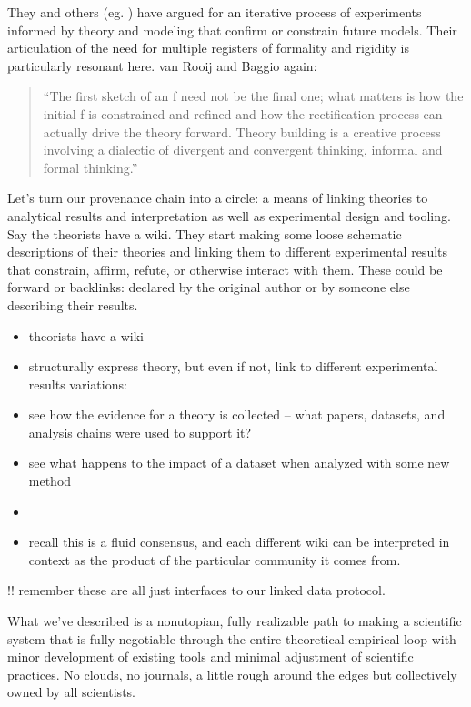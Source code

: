 \documentclass[notoc]{tufte-book}
\begin{document}
They and others (eg. \citep{guestHowComputationalModeling2021} )
have argued for an iterative process of experiments informed by theory
and modeling that confirm or constrain future models. Their articulation
of the need for multiple registers of formality and rigidity is
particularly resonant here. van Rooij and Baggio again:

\begin{quote}
``The first sketch of an f need not be the final one; what matters is
how the initial f is constrained and refined and how the rectification
process can actually drive the theory forward. Theory building is a
creative process involving a dialectic of divergent and convergent
thinking, informal and formal thinking.'' \citep{vanrooijTheoryTestHow2021} 
\end{quote}

Let's turn our provenance chain into a circle: a means of linking
theories to analytical results and interpretation as well as
experimental design and tooling. Say the theorists have a wiki. They
start making some loose schematic descriptions of their theories and
linking them to different experimental results that constrain, affirm,
refute, or otherwise interact with them. These could be forward or
backlinks: declared by the original author or by someone else describing
their results.


\begin{itemize}

\item
  theorists have a wiki
\item
  structurally express theory, but even if not, link to different
  experimental results variations:
\item
  see how the evidence for a theory is collected -- what papers,
  datasets, and analysis chains were used to support it?
\item
  see what happens to the impact of a dataset when analyzed with some
  new method
\item
\item
  recall this is a fluid consensus, and each different wiki can be
  interpreted in context as the product of the particular community it
  comes from.
\end{itemize}

!! remember these are all just interfaces to our linked data protocol.

What we've described is a nonutopian, fully realizable path to making a
scientific system that is fully negotiable through the entire
theoretical-empirical loop with minor development of existing tools and
minimal adjustment of scientific practices. No clouds, no journals, a
little rough around the edges but collectively owned by all scientists.
\end{document}
